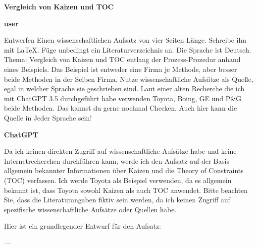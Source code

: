 \textbf{Vergleich von Kaizen und TOC}

\textbf{user}

Entwerfen Einen wissenschaftlichen Aufsatz von vier Seiten Länge. Schreibe ihn mit \LaTeX{}. Füge unbedingt ein Literaturverzeichnis an. Die Sprache ist Deutsch. Thema: Vergleich von Kaizen und TOC entlang der Prozess-Prozedur anhand eines Beispiels. Das Beispiel ist entweder eine Firma je Methode, aber besser beide Methoden in der Selben Firma. Nutze wissenschaftliche Aufsätze als Quelle, egal in welcher Sprache sie geschrieben sind. Laut einer alten Recherche die ich mit ChatGPT 3.5 durchgeführt habe verwenden Toyota, Boing, GE und P\&G beide Methoden. Das kannst du gerne nochmal Checken. Auch hier kann die Quelle in Jeder Sprache sein! 

\textbf{ChatGPT}

Da ich keinen direkten Zugriff auf wissenschaftliche Aufsätze habe und keine Internetrecherchen durchführen kann, werde ich den Aufsatz auf der Basis allgemein bekannter Informationen über Kaizen und die Theory of Constraints (TOC) verfassen. Ich werde Toyota als Beispiel verwenden, da es allgemein bekannt ist, dass Toyota sowohl Kaizen als auch TOC anwendet. Bitte beachten Sie, dass die Literaturangaben fiktiv sein werden, da ich keinen Zugriff auf spezifische wissenschaftliche Aufsätze oder Quellen habe. 

Hier ist ein grundlegender Entwurf für den Aufsatz:

---

